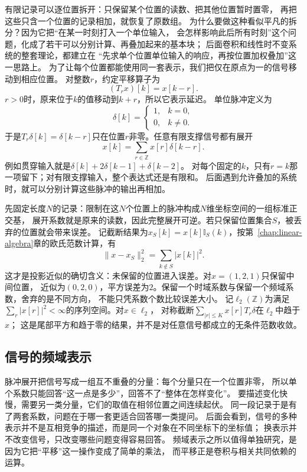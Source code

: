 有限记录可以逐位置拆开：只保留某个位置的读数、把其他位置暂时置零，
再把这些只含一个位置的记录相加，就恢复了原数组。
为什么要做这种看似平凡的拆分？因为它把“在某一时刻打入一个单位输入，
会怎样影响此后所有时刻”这个问题，化成了若干可以分别计算、再叠加起来的基本块；
后面卷积和线性时不变系统的整套理论，都建立在
“先求单个位置单位输入的响应，再按位置加权叠加”这一思路上。
为了让每个位置都能使用同一套表示，我们把仅在原点为一的信号移动到相应位置。
对整数$r$，约定平移算子为
\[
  (T_rx)[k]=x[k-r].
\]
$r>0$时，原来位于$k$的值移动到$k+r$，所以它表示延迟。
单位脉冲定义为
\[
  \delta[k]=
  \begin{cases}
    1,&k=0,\\
    0,&k\neq0.
  \end{cases}
\]
于是$T_r\delta[k]=\delta[k-r]$只在位置$r$非零。任意有限支撑信号都有展开
\begin{equation}
  x[k]=\sum_{r\in\mathbb Z}x[r]\delta[k-r].
  \label{eq:signal-analysis-impulse-expansion}
\end{equation}
例如贯穿输入就是$\delta[k]+2\delta[k-1]+\delta[k-2]$。
对每个固定的$k$，只有$r=k$那一项留下；对有限支撑输入，整个表达式还是有限和。
后面遇到允许叠加的系统时，就可以分别计算这些脉冲的输出再相加。

先固定长度$N$的记录：限制在这$N$个位置上的脉冲构成$N$维坐标空间的一组标准正交基，
展开系数就是原来的读数，因此完整展开可逆。若只保留位置集合$S$，被丢弃的位置就会带来误差。
记截断结果为$x_S[k]=x[k]\mathbb I_S(k)$，按第~\ref{chap:linear-algebra}章的欧氏范数计算，有
\[
  \|x-x_S\|_2^2=\sum_{k\notin S}|x[k]|^2.
\]
这才是投影近似的确切含义：未保留的位置进入误差。对$x=(1,2,1)$只保留中间位置，
近似为$(0,2,0)$，平方误差为$2$。保留一个时域系数与保留一个频域系数，舍弃的是不同方向，
不能只凭系数个数比较误差大小。
记$\ell_2(\mathbb Z)$为满足$\sum_r|x[r]|^2<\infty$的序列空间。对$x\in\ell_2$，
对称截断$\sum_{|r|\leq K}x[r]T_r\delta$在$\ell_2$中趋于$x$；
这是尾部平方和趋于零的结果，并不是对任意信号都成立的无条件范数收敛。

\subsection{信号的频域表示}
\label{sec:signal-analysis-frequency-representation}

脉冲展开把信号写成一组互不重叠的分量：每个分量只在一个位置非零，
所以单个系数只能回答“这一点是多少”，回答不了“整体在怎样变化”。
要描述变化快慢，需要另一类分量，它们的取值在相邻位置之间连续起伏。
同一段记录于是有了两套系数，问题在于哪一套更适合回答哪一类提问。
后面会看到，信号的多种表示并不是互相竞争的描述，而是同一个对象在不同坐标下的坐标值；
换表示并不改变信号，只改变哪些问题变得容易回答。
频域表示之所以值得单独研究，是因为它把“平移”这一操作变成了简单的乘法，
而平移正是卷积与相关共同依赖的运算。

